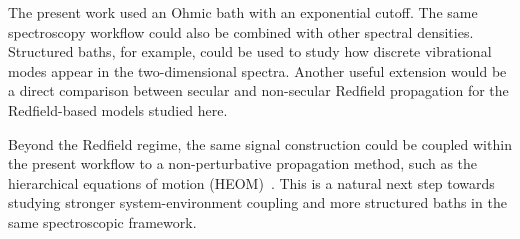 The present work used an Ohmic bath with an exponential cutoff. The same spectroscopy workflow could also be combined with other spectral densities. Structured baths, for example, could be used to study how discrete vibrational modes appear in the two-dimensional spectra. Another useful extension would be a direct comparison between secular and non-secular Redfield propagation for the Redfield-based models studied here.

Beyond the Redfield regime, the same signal construction could be coupled within the present workflow to a non-perturbative propagation method, such as the hierarchical equations of motion (HEOM)~\cite{lambertetal2023qutipbofinbosonicfermionic}. This is a natural next step towards studying stronger system-environment coupling and more structured baths in the same spectroscopic framework.
